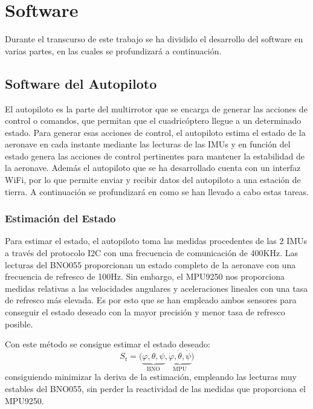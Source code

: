 \chapter{Software}

Durante el transcurso de este trabajo se ha dividido el desarrollo del software en varias partes, en las cuales se profundizará a continuación.

\section{Software del Autopiloto}
	
	El autopiloto es la parte del multirrotor que se encarga de generar las acciones de control o comandos, que permitan que el cuadricóptero llegue a un determinado estado.
	Para generar esas acciones de control, el autopiloto estima el estado de la aeronave en cada instante mediante las lecturas de las IMUs y en función del estado genera las acciones de control pertinentes para mantener la estabilidad de la aeronave. Además el autopiloto que se ha desarrollado cuenta con un interfaz WiFi, por lo que permite enviar y recibir datos del autopiloto a una estación de tierra. A continuación se profundizará en como se han llevado a cabo estas tareas.

\subsection{Estimación del Estado}
	Para estimar el estado, el autopiloto toma las medidas procedentes de las 2 IMUs a través del protocolo I2C con una frecuencia de comunicación de 400KHz.
	Las lecturas del BNO055 proporcionan un estado completo de la aeronave con una frecuencia de refresco de 100Hz. Sin embargo, el MPU9250 nos proporciona medidas relativas a las velocidades angulares y aceleraciones lineales con una tasa de refresco más elevada. Es por esto que se han empleado ambos sensores para conseguir el estado deseado con la mayor precisión y menor tasa de refresco posible.
	
	Con este método se consigue estimar el estado deseado:
	 \begin{equation}
	 	S_t=\big(\underbrace{\varphi,\theta,\psi}_\text{BNO} ,\underbrace{\dot\varphi,\dot\theta,\dot\psi}_\text{MPU} \big)
	 \end{equation}
	consiguiendo minimizar la deriva de la estimación, empleando las lecturas muy estables del BNO055, sin perder la reactividad de las medidas que proporciona el MPU9250.
	
